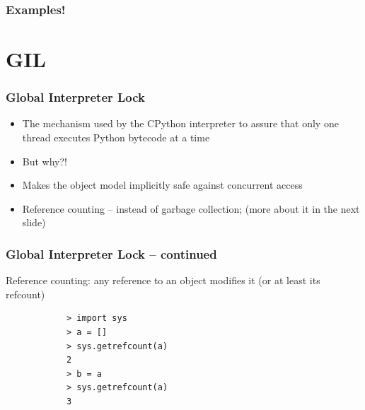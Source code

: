 \documentclass{beamer}
\begin{document}
    \begin{frame}
        \frametitle{Examples!}


    \end{frame}


    \section{GIL}

    \begin{frame}
        \frametitle{Global Interpreter Lock}

        \begin{itemize}
            \item The mechanism used by the CPython interpreter to assure that only one thread executes Python bytecode at a time
            \item But why?!
            \item Makes the object model implicitly safe against concurrent access
            \item Reference counting -- instead of garbage collection; (more about it in the next slide)
        \end{itemize}

    \end{frame}

    \begin{frame}[fragile]
        \frametitle{Global Interpreter Lock -- continued}

        Reference counting:
        any reference to an object modifies it (or at least its refcount)
        \begin{verbatim}
            > import sys
            > a = []
            > sys.getrefcount(a)
            2
            > b = a
            > sys.getrefcount(a)
            3
        \end{verbatim}
    \end{frame}
\end{document}
